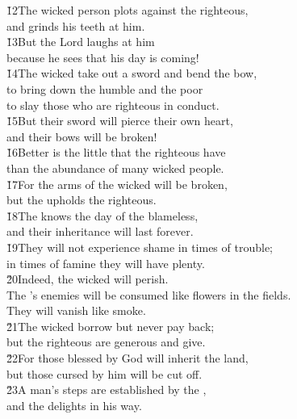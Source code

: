 \begin{poetry}
\poeml \v{12}The wicked person plots against the righteous, \\
\poemll    and grinds his teeth at him. \\
\poeml \v{13}But the Lord laughs at him \\
\poemll    because he sees that his day is coming! \\
\poeml \v{14}The wicked take out a sword and bend the bow, \\
\poemll    to bring down the humble and the poor \\
\poemlll       to slay those who are righteous in conduct. \\
\poeml \v{15}But their sword will pierce their own heart, \\
\poemll    and their bows will be broken! \\
\poeml \v{16}Better is the little that the righteous have \\
\poemll    than the abundance of many wicked people. \\
\poeml \v{17}For the arms of the wicked will be broken, \\
\poemll    but the  upholds the righteous. \\
\poeml \v{18}The  knows the day of the blameless, \\
\poemll    and their inheritance will last forever. \\
\poeml \v{19}They will not experience shame in times of trouble; \\
\poemll    in times of famine they will have plenty. \\
\poeml \v{20}Indeed, the wicked will perish. \\
\poemll    The 's enemies will be consumed like flowers in the fields. \\
\poemlll       They will vanish like smoke. \\
\poeml \v{21}The wicked borrow but never pay back; \\
\poemll    but the righteous are generous and give. \\
\poeml \v{22}For those blessed by God will inherit the land, \\
\poemll    but those cursed by him will be cut off. \\
\poeml \v{23}A man's steps are established by the , \\
\poemll    and the  delights in his way. \\

\end{poetry}

